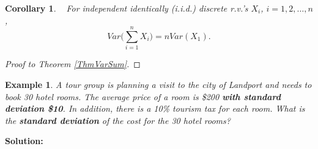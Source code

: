 \documentclass[12pt]{amsart}
\newtheorem{corollary}{Corollary}[theorem]
\newtheorem{example}[theorem]{Example}
\begin{document}
{%
\vspace{.1cm}
\begin{corollary}\ \newline
For independent identically (i.i.d.) discrete r.v.'s $X_i$, $i=1,2,\dots, n$, 
$$
Var\Big(\sum_{i=1}^n X_i\Big) = n Var(X_1).
$$ 
\end{corollary}

\vspace{.1cm}
\begin{proof}[Proof to Theorem \ref{ThmVarSum}]
\end{proof}



\newpage

 
\begin{example}\label{LandportHotels}
A tour group is planning a visit to the city of Landport and needs to book 30 hotel rooms. 
The average price of a room is \$200 \textbf{with standard deviation \$10}. In addition, there is a 10\% tourism tax for each room.
\newline
What is the \textbf{standard deviation} of the cost for the 30 hotel rooms?
\end{example}

\textbf{Solution:}



}  %
\end{document}
